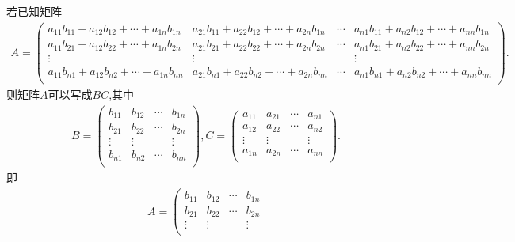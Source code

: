 \documentclass[lang=cn,newtx,10pt,scheme=chinese]{elegantbook}
\begin{document}
\begin{proposition}\label{proposition:可以写成两个矩阵(向量)乘积的矩阵}
    若已知矩阵\begin{align*}
        A=\left( \begin{matrix}
            a_{11}b_{11}+a_{12}b_{12}+\cdots +a_{1n}b_{1n}&		a_{21}b_{11}+a_{22}b_{12}+\cdots +a_{2n}b_{1n}&		\cdots&		a_{n1}b_{11}+a_{n2}b_{12}+\cdots +a_{nn}b_{1n}\\
            a_{11}b_{21}+a_{12}b_{22}+\cdots +a_{1n}b_{2n}&		a_{21}b_{21}+a_{22}b_{22}+\cdots +a_{2n}b_{2n}&		\cdots&		a_{n1}b_{21}+a_{n2}b_{22}+\cdots +a_{nn}b_{2n}\\
            \vdots&		\vdots&		&		\vdots\\
            a_{11}b_{n1}+a_{12}b_{n2}+\cdots +a_{1n}b_{nn}&		a_{21}b_{n1}+a_{22}b_{n2}+\cdots +a_{2n}b_{nn}&		\cdots&		a_{n1}b_{n1}+a_{n2}b_{n2}+\cdots +a_{nn}b_{nn}\\
        \end{matrix} \right) .
    \end{align*}
    则矩阵$A$可以写成$BC$,其中
    \begin{align*}
        B=\left( \begin{matrix}
            b_{11}&		b_{12}&		\cdots&		b_{1n}\\
            b_{21}&		b_{22}&		\cdots&		b_{2n}\\
            \vdots&		\vdots&		&		\vdots\\
            b_{n1}&		b_{n2}&		\cdots&		b_{nn}\\
        \end{matrix} \right),
        C=\left( \begin{matrix}
            a_{11}&		a_{21}&		\cdots&		a_{n1}\\
            a_{12}&		a_{22}&		\cdots&		a_{n2}\\
            \vdots&		\vdots&		&		\vdots\\
            a_{1n}&		a_{2n}&		\cdots&		a_{nn}\\
        \end{matrix} \right) .
    \end{align*}
    即\begin{align*}
        A=\left( \begin{matrix}
            b_{11}&		b_{12}&		\cdots&		b_{1n}\\
            b_{21}&		b_{22}&		\cdots&		b_{2n}\\
            \vdots&		\vdots&		&		\vdots\\

\end{matrix}
\end{align*}
\end{proposition}
\end{document}
